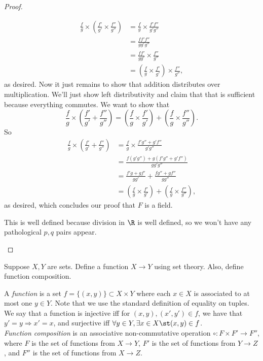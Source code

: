 \documentclass{assignment}
\begin{document}
\begin{proof}
\begin{qparts}
\begin{align*}
    \frac{f}{g} \times \left(\frac{f'}{g'} \times \frac{f''}{g''}\right) 
  &= \frac{f}{g} \times \frac{f'f''}{ g'g''} \\
  &= \frac{ff'f''}{gg'g''} \\
  &= \frac{ff'}{gg'} \times \frac{f''}{ g''} \\
  &= \left(\frac{f}{g} \times \frac{f'}{g'}\right) \times \frac{f''}{g''},
  \end{align*}
  as desired. Now it just remains to show that addition distributes over multiplication. We'll just show
  left distributivity and claim that that is sufficient because everything commutes. We want to show 
  that $$\frac{f}{g}\times\left(\frac{f'}{g'}+\frac{f''}{g''}\right) = \left(\frac{f}{g}\times\frac{f'}
  {g'}\right) + \left(\frac{f}{g}\times\frac{f''}{g''}\right).$$ So
  \begin{align*}
    \frac{f}{g}\times\left(\frac{f'}{g'}+\frac{f''}{g''}\right) 
    &= \frac{f}{g}\times\frac{f'g'' + g'f''}{g'g''} \\
    &= \frac{f(g'g'') + g(f'g'' + g'f'')}{gg'g''} \\
    &= \frac{f'g + gf'}{gg'} + \frac{fg'' + gf''}{gg''} \\
    &= \left(\frac{f}{g}\times\frac{f'}{g'}\right) + \left(\frac{f}{g}\times\frac{f''}{g''}\right),
  \end{align*}
  as desired, which concludes our proof that $F$ is a field.

  \item This is well defined because division in $\R$ is well defined, so we won't have any pathological
    $p,q$ pairs appear.
  \end{qparts}
\end{proof}

\begin{question}[3]
  Suppose $X,Y$ are sets. Define a function $X \to Y$ using set theory. Also, define function composition.
\end{question}
A \emph{function} is a set $f = \{(x,y)\} \subset X\times Y$ where each $x\in X$ is associated to at
most one $y\in Y$. Note that we use the standard definition of equality on tuples. We say that a
function is injective iff for $(x, y), (x', y')\in f$, we have that $y' = y \Rightarrow x' = x$, and
surjective iff $\forall y\in Y, \exists x\in X \st (x,y)\in f$. \\

\emph{Function composition} is an associative non-commutative operation $\circ: F\times F' \to F''$,
where $F$ is the set of functions from $X\to Y$, $F'$ is the set of functions from $Y\to Z$, and
$F''$ is the set of functions from $X\to Z$. 
\end{document}
